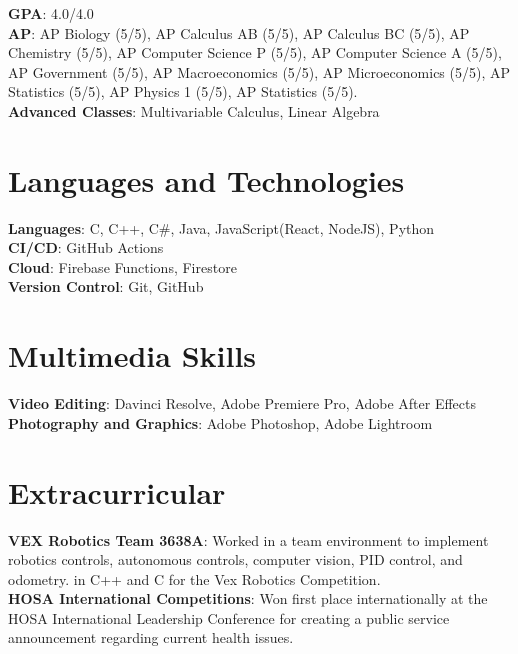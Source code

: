 \documentclass[letterpaper,10pt]{article}
\begin{document}
 \begin{itemize}[leftmargin=0.15in, label={}]
    \small{\item{
     \textbf{GPA}{: 4.0/4.0} \\
     \textbf{AP}{: AP Biology (5/5), AP Calculus AB (5/5), AP Calculus BC (5/5), AP Chemistry (5/5), AP Computer Science P (5/5), AP Computer Science A (5/5), AP Government (5/5), AP Macroeconomics (5/5), AP Microeconomics (5/5), AP Statistics (5/5), AP Physics 1 (5/5), AP Statistics (5/5).} \\
     \textbf{Advanced Classes}{: Multivariable Calculus, Linear Algebra}
    }}
 \end{itemize}
 \vspace{-15pt}
\section{Languages and Technologies} 
 \begin{itemize}[leftmargin=0.15in, label={}]
    \small{\item{
    \textbf{Languages}{: C, C++, C\#, Java, JavaScript(React, NodeJS), Python} \\
     \textbf{CI/CD}{: GitHub Actions} \\
     \textbf{Cloud}{: Firebase Functions, Firestore}\\
     \textbf{Version Control}{: Git, GitHub}
    }}
 \end{itemize}
 \vspace{-20pt}
\section{Multimedia Skills} 
 \begin{itemize}[leftmargin=0.15in, label={}]
    \small{\item{
    \textbf{Video Editing}{: Davinci Resolve, Adobe Premiere Pro, Adobe After Effects} \\
     \textbf{Photography and Graphics}{: Adobe Photoshop, Adobe Lightroom} \\
    }}
 \end{itemize}

\section{Extracurricular}
 \begin{itemize}[leftmargin=0.15in, label={}]
    \small{\item{
     \textbf{VEX Robotics Team 3638A}{: Worked in a team environment to implement robotics controls,
autonomous controls, computer vision, PID control, and odometry.
in C++ and C for the Vex Robotics Competition.} \\
     \textbf{HOSA International Competitions}{: Won first place internationally at the HOSA International Leadership Conference for creating a public service announcement regarding current health issues.} 

    }}

 \end{itemize}
\end{document}
